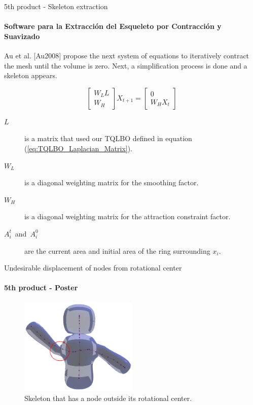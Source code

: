 \documentclass[10pt, compress, english]{beamer}
\begin{document}
\begin{frame}{5th product - Skeleton extraction}


\framesubtitle{Software para la Extracción del Esqueleto por Contracción y Suavizado}


Au et al. {[}Au2008{]} propose the next system of equations to iteratively
contract the mesh until the volume is zero. Next, a simplification
process is done and a skeleton appears.


\begin{equation}
\left[\begin{array}{c}
W_{L}L\\
W_{H}
\end{array}\right]X_{t+1}=\left[\begin{array}{c}
0\\
W_{H}X_{t}
\end{array}\right]\label{eq:SkeletonExtraction}
\end{equation}

\begin{description}
\item [{$L$}] is a matrix that used our TQLBO defined in equation (\ref{eq:TQLBO_Laplacian_Matrix}). 
\item [{$W_{L}$}] is a diagonal weighting matrix for the smoothing factor.
\item [{$W_{H}$}] is a diagonal weighting matrix for the attraction constraint
factor. 
\item [{$A_{i}^{t}$~and~$A_{i}^{0}$}] are the current area and initial
area of the ring surrounding $x_{i}$.
\end{description}
\end{frame}



\begin{frame}{{\large{}Undesirable displacement of nodes from rotational center}}


\framesubtitle{5th product - Poster}



\begin{figure}
\begin{centering}
\includegraphics[width=0.5\textwidth]{img/skeleton_problem}
\par\end{centering}

\protect\caption{Skeleton that has a node outside its rotational center.}


\end{figure}


\end{frame}
\end{document}
